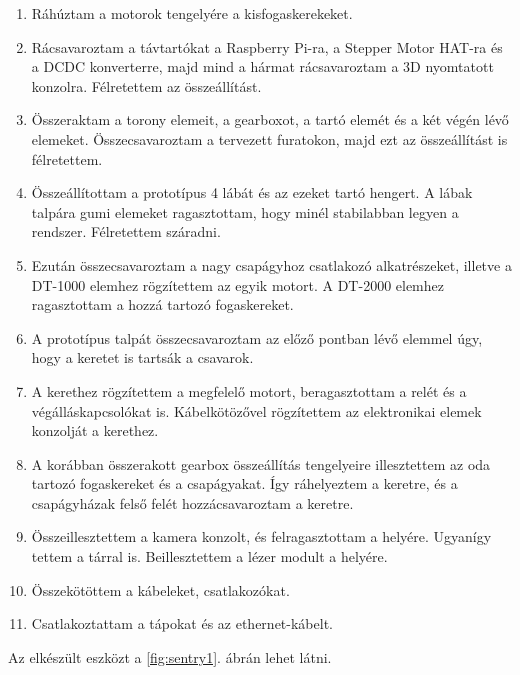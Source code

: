 \documentclass[12pt,a4paper]{article}
\begin{document}
\begin{enumerate}
	\item Ráhúztam a motorok tengelyére a kisfogaskerekeket. 
	\item Rácsavaroztam a távtartókat a Raspberry Pi-ra, a Stepper Motor HAT-ra és a DCDC konverterre, majd mind a hármat rácsavaroztam a 3D nyomtatott konzolra. Félretettem az összeállítást.
	\item Összeraktam a torony elemeit, a gearboxot, a tartó elemét és a két végén lévő elemeket. Összecsavaroztam a tervezett furatokon, majd ezt az összeállítást is félretettem. 
	\item Összeállítottam a prototípus 4 lábát és az ezeket tartó hengert. A lábak talpára gumi elemeket ragasztottam, hogy minél stabilabban legyen a rendszer. Félretettem száradni.
	\item Ezután összecsavaroztam a nagy csapágyhoz csatlakozó alkatrészeket, illetve a DT-1000 elemhez rögzítettem az egyik motort. A DT-2000 elemhez ragasztottam a hozzá tartozó fogaskereket.
	\item A prototípus talpát összecsavaroztam az előző pontban lévő elemmel úgy, hogy a keretet is tartsák a csavarok.
	\item A kerethez rögzítettem a megfelelő motort, beragasztottam a relét és a végálláskapcsolókat is. Kábelkötözővel rögzítettem az elektronikai elemek konzolját a kerethez.
	\item A korábban összerakott gearbox összeállítás tengelyeire illesztettem az oda tartozó fogaskereket és a csapágyakat. Így ráhelyeztem a keretre, és a csapágyházak felső felét hozzácsavaroztam a keretre. 
	\item Összeillesztettem a kamera konzolt, és felragasztottam a helyére. Ugyanígy tettem a tárral is. Beillesztettem a lézer modult a helyére.
	\item Összekötöttem a kábeleket, csatlakozókat.
	\item Csatlakoztattam a tápokat és az ethernet-kábelt.
\end{enumerate}
Az elkészült eszközt a \ref{fig:sentry1}. ábrán lehet látni.
\pagebreak
\end{document}
